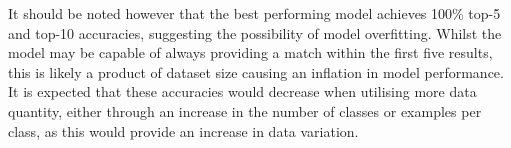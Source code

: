 It should be noted however that the best performing model achieves 100\% top-5 and top-10 accuracies, suggesting the possibility of model overfitting. Whilst the model may be capable of always providing a match within the first five results, this is likely a product of dataset size causing an inflation in model performance. It is expected that these accuracies would decrease when utilising more data quantity, either through an increase in the number of classes or examples per class, as this would provide an increase in data variation.












